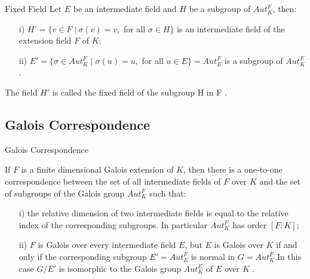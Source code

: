 \documentclass{beamer}
\begin{document}
\begin{frame}{Fixed Field}
  Let \(E\) be an intermediate field and \(H\) be a subgroup of \(Aut_K^F\), then:
\begin{enumerate}
\item[i)] \(H' = \{v \in F \; | \: \sigma(v)=v,\) for all \(\sigma \in H \}\) is an intermediate field of the extension field \(F\) of \(K\);
\item[ii)] \(E' = \{\sigma \in Aut_K^F \; | \; \sigma(u)=u,\) for all \(u \in E\}=Aut_E^F\) is a subgroup of \(Aut_K^F\).
\end{enumerate}

The field \(H'\) is called the fixed field of the subgroup H in F \cite{hunger}.
\end{frame}

\subsection{Galois Correspondence}
\begin{frame}{Galois Correspondence}
    \begin{tcolorbox}[colframe=blue!40, boxsep=2mm]
  \begin{theorem}
  If \(F\) is a finite dimensional Galois extension of \(K\), then there is a one-to-one correspondence between the set of all intermediate fields of \(F\) over \(K\) and the set of subgroups of the Galois group \(Aut_K^F\) such that:
  \begin{enumerate}
  \item[i)] the relative dimension of two intermediate fields is equal to the relative index of the corresponding subgroups. In particular \(Aut_K^F\) has order \([F:K]\);
  \item[ii)] \(F\) is Galois over every intermediate field \(E\), but \(E\) is Galois over \(K\) if and only if the corresponding subgroup \(E'= Aut_E^F\) is normal in \(G=Aut_K^F\).In this case \(G/E'\) is isomorphic to the Galois group \(Aut_K^E\) of \(E\) over \(K\) \cite{hunger}.
  \end{enumerate}
\end{theorem}
\end{tcolorbox}
\end{frame}
\end{document}
